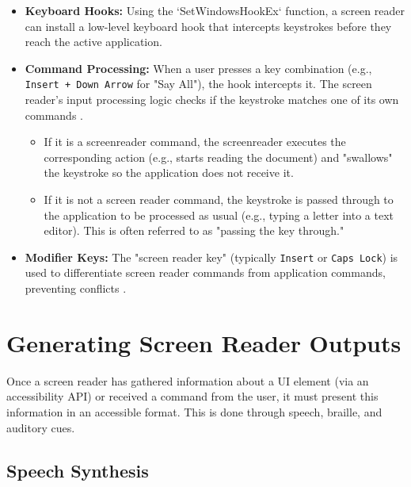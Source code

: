 \begin{itemize}
	\item \textbf{Keyboard Hooks:} Using the `SetWindowsHookEx` function, a screen reader can install a low-level keyboard hook that intercepts keystrokes before they reach the active application.
	\item \textbf{Command Processing:} When a user presses a key combination (e.g., \texttt{Insert + Down Arrow} for "Say All"), the hook intercepts it. The screen reader's input processing logic checks if the keystroke matches one of its own commands \cite{JAWSBasicCommands, NVDAKeyboardCommands, NarratorKeyboardCommands}.
	      \begin{itemize}
		      \item If it is a \gls{screenreader} command, the \gls{screenreader} executes the corresponding action (e.g., starts reading the document) and "swallows" the keystroke so the application does not receive it.
		      \item If it is not a screen reader command, the keystroke is passed through to the application to be processed as usual (e.g., typing a letter into a text editor). This is often referred to as "passing the key through."
	      \end{itemize}
	\item \textbf{Modifier Keys:} The "screen reader key" (typically \texttt{Insert} or \texttt{Caps Lock}) is used to differentiate screen reader commands from application commands, preventing conflicts \cite{WebAIMShortcuts}.
\end{itemize}

\section{Generating Screen Reader Outputs}
\label{sec:generating-screen-reader-outputs}

Once a screen reader has gathered information about a UI element (via an accessibility API) or received a command from the user, it must present this information in an accessible format. This is done through speech, braille, and auditory cues.

\subsection{Speech Synthesis}
\label{sub:speech-synthesis}

